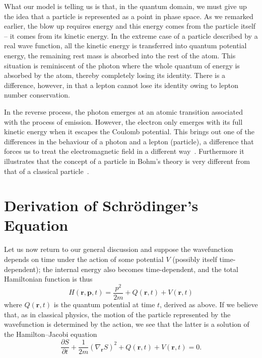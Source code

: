 \documentclass[11pt]{article}%
\begin{document}
What our model is telling us is that, in the quantum domain, we must give up
the idea that a particle is represented as a point in phase space. As we
remarked earlier, the blow up requires energy and this energy comes from the
particle itself -- it comes from its kinetic energy. In the extreme case of a
particle described by a real wave function, all the kinetic energy is
transferred into quantum potential energy, the remaining rest mass is absorbed
into the rest of the atom. This situation is reminiscent of the photon where
the whole quantum of energy is absorbed by the atom, thereby completely losing
its identity. There is a difference, however, in that a lepton cannot lose its
identity owing to lepton number conservation.

In the reverse process, the photon emerges at an atomic transition associated
with the process of emission. However, the electron only emerges with its full
kinetic energy when it escapes the Coulomb potential. This brings out one of
the differences in the behaviour of a photon and a lepton (particle), a
difference that forces us to treat the electromagnetic field in a different
way~\cite{dbbhpk87}. Furthermore it illustrates that the concept of a particle
in Bohm's theory is very different from that of a classical
particle~\cite{ppiibh14}.

\section{Derivation of Schr\"{o}dinger's Equation}

Let us now return to our general discussion and suppose the wavefunction
depends on time under the action of some potential $V$ (possibly itself
time-dependent); the internal energy also becomes time-dependent, and the
total Hamiltonian function is thus%
\begin{equation}
H(\mathbf{r},\mathbf{p},t)=\frac{p^{2}}{2m}+Q(\mathbf{r},t)+V(\mathbf{r},t)
\label{3}%
\end{equation}
where $Q(\mathbf{r},t)$ is the quantum potential at time $t$, derived as
above. If we believe that, as in classical physics, the motion of the particle
represented by the wavefunction is determined by the action, we see that the
latter is a solution of the Hamilton--Jacobi equation%
\begin{equation}
\frac{\partial S}{\partial t}+\frac{1}{2m}(\nabla_{\mathbf{r}}S)^{2}%
+Q(\mathbf{r},t)+V(\mathbf{r},t)=0. \label{4}%
\end{equation}
\end{document}
